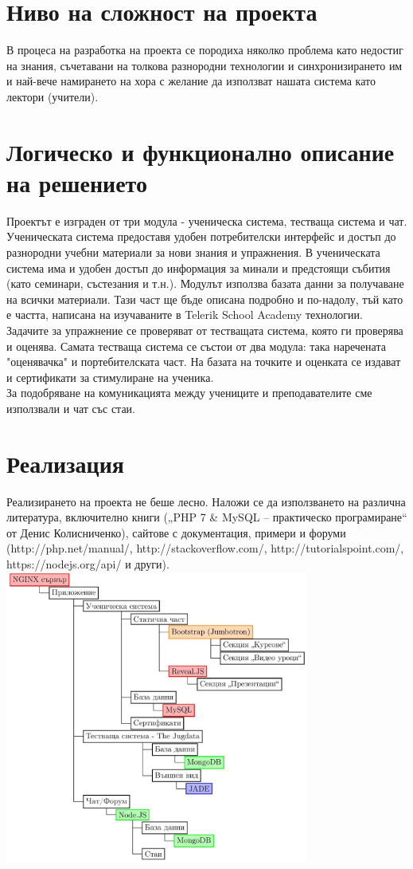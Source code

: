 \documentclass[12pt]{article}
\begin{document}
	\section{Ниво на сложност на проекта}
	В процеса на разработка на проекта се породиха няколко проблема като недостиг на знания, съчетавани на толкова разнородни технологии и синхронизирането им и най-вече намирането на хора с желание да използват нашата система като лектори (учители).
	\section{Логическо и функционално описание на решението}
	Проектът е изграден от три модула - ученическа система, тестваща система и чат.
	Ученическата система предоставя удобен потребителски интерфейс и достъп до разнородни учебни материали за нови знания и упражнения. В ученическата система има и удобен достъп до информация за минали и предстоящи събития (като семинари, състезания и т.н.). Модулът използва базата данни за получаване на всички материали. Тази част ще бъде описана подробно и по-надолу, тъй като е частта, написана на изучаваните в Telerik School Academy технологии.\\
	Задачите за упражнение се проверяват от тестващата система, която ги проверява и оценява. Самата тестваща система се състои от два модула: така наречената "оценявачка" и портебителската част. На базата на точките и оценката се издават и сертификати за стимулиране на ученика. \\
	За подобряване на комуникацията между учениците и преподавателите сме използвали и чат със стаи.
	\section{Реализация}
	Реализирането на проекта не беше лесно. Наложи се да използването на различна литература, включително книги („PHP 7 \& MySQL – практическо програмиране“ от Денис Колисниченко), сайтове с документация, примери и форуми (http://php.net/manual/, http://stackoverflow.com/, http://tutorialspoint.com/, https://nodejs.org/api/ и други).\\
	\includegraphics[width=0.75\textwidth]{arch.jpg}\\
\end{document}
